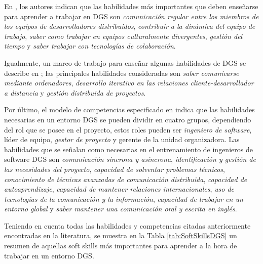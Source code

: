 En \cite{paasivaara2013teaching}, los autores indican que las habilidades más importantes que deben enseñarse para aprender a trabajar en DGS son \emph{comunicación regular entre los miembros de los equipos de desarrolladores distribuidos}, \emph{contribuir a la dinámica del equipo de trabajo}, \emph{saber como trabajar en equipos culturalmente divergentes}, \emph{gestión del tiempo} y \emph{saber trabajar con tecnologías de colaboración}.

Igualmente, un marco de trabajo para enseñar algunas habilidades de DGS se describe en \cite{damian2006instructional}; las principales habilidades consideradas son \emph{saber comunicarse mediante ordenadores}, \emph{desarrollo iterativo en las relaciones cliente-desarrollador a distancia} y \emph{gestión distribuida de proyectos}.

Por último, el modelo de competencias especificado en \cite{saldana2014skills} indica que las habilidades necesarias en un entorno DGS se pueden dividir en cuatro grupos, dependiendo del rol que se posee en el proyecto, estos roles pueden ser \emph{ingeniero de software}, líder de equipo, \emph{gestor de proyecto} y gerente de la unidad organizadora. Las habilidades que se señalan como necesarias en el entrenamiento de ingenieros de software DGS son \emph{comunicación síncrona y asíncrona}, \emph{identificación  y gestión de las necesidades del proyecto}, \emph{capacidad de solventar problemas técnicos}, \emph{conocimiento de técnicas avanzadas de comunicación distribuida}, \emph{capacidad de autoaprendizaje}, \emph{capacidad de mantener relaciones internacionales}, \emph{uso de tecnologías de la comunicación y la información}, \emph{capacidad de trabajar en un entorno global} y \emph{saber mantener una comunicación oral y escrita en inglés}.

Teniendo en cuenta todas las habilidades y competencias citadas anteriormente encontradas en la literatura, se muestra en la Tabla \ref{tab:SoftSkillsDGS} un resumen de aquellas soft skills más importantes para aprender a la hora de trabajar en un entorno DGS.

